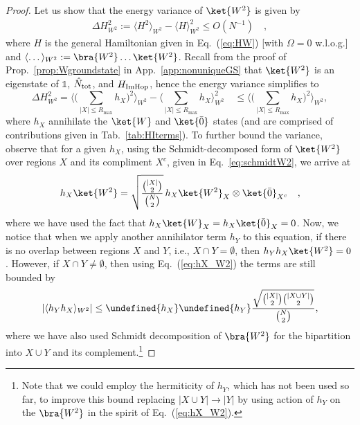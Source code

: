 \documentclass[prx,letterpaper,aps,superscriptaddress,floatfix,twocolumn,nofootinbib]{revtex4-2}
\let\norm\undefined
\DeclarePairedDelimiter\norm{\lVert}{\rVert}
\theoremstyle{definition}
\newcommand{\defn}{:=}
\begin{document}
\begin{proof}
%
Let us show that the energy variance of $\ket{W^2}$ is given by
    \begin{align}
        \Delta H_{W^2}^2 \defn \langle H^2 \rangle_{W^2} - \langle H \rangle_{W^2}^2 \leq O(N^{-1}) \quad,
    \end{align}
    where $H$ is the general Hamiltonian given in Eq.~(\ref{eq:HW}) [with $\Omega = 0$ w.l.o.g.] and $\langle \dots \rangle_{W^2} \defn \bra{W^2} \dots \ket{W^2}$.
    Recall from the proof of Prop.~\ref{prop:Wgroundstate} in App.~\ref{app:nonuniqueGS} that $\ket{W^2}$ is an eigenstate of $\mathds{1}$, $\hat{N}_{\rm tot}$, and $H_{\rm ImHop}$, hence the energy variance simplifies to
    \begin{equation}
    \Delta H_{W^2}^2 = \bigg\langle \bigg(\sum_{|X|\leq R_{\text{max}}} h_X \bigg)^2 \bigg\rangle_{W^2} -\bigg\langle \sum_{|X|\leq R_{\text{max}}} h_X \bigg\rangle_{W^2}^2\quad \leq \bigg\langle \bigg(\sum_{|X|\leq R_{\text{max}}} h_X \bigg)^2 \bigg\rangle_{W^2},
    \end{equation}
    where $h_X$ annihilate the $\ket{W}$ and $\ket{\bar{0}}$ states (and are comprised of contributions given in Tab.~\ref{tab:HIterms}).
    To further bound the variance, observe that for a given $h_X$, using the Schmidt-decomposed form of $\ket{W^2}$ over regions $X$ and its compliment $X^c$, given in Eq.~\eqref{eq:schmidtW2}, we arrive at
    \begin{align}
        h_X \ket{W^2} = \sqrt{\frac{\binom{|X|}{2}}{\binom{N}{2}}}\, h_X \ket{W^2}_X \otimes \ket{\bar{0}}_{X^c}\quad,
        \label{eq:hX_W2}
    \end{align}
    where we have used the fact that $h_X \ket{W}_X = h_X \ket{\bar{0}}_X = 0$.
    Now, we notice that when we apply another annihilator term $h_Y$ to this equation, if there is no overlap between regions $X$ and $Y$, i.e., $X \cap Y = \emptyset$, then
    $h_Y h_X \ket{W^2} = 0$.
    However, if $X\cap Y\neq\emptyset$, then using Eq.~(\ref{eq:hX_W2}) the terms are still bounded by
    \begin{equation}
    |\langle h_Y h_X\rangle_{W^2}|\leq \norm{h_X}\norm{h_Y}\frac{\sqrt{\binom{|X|}{2} \binom{|X\cup Y|}{2}}}{\binom{N}{2}},
    \end{equation}
    where we have also used Schmidt decomposition of $\bra{W^2}$ for the bipartition into $X \cup Y$ and its complement.\footnote{Note that we could employ the hermiticity of $h_Y$, which has not been used so far, to improve this bound replacing $|X \cup Y| \to |Y|$ by using action of $h_Y$ on the $\bra{W^2}$ in the spirit of Eq.~(\ref{eq:hX_W2}).}

\end{proof}
\end{document}
